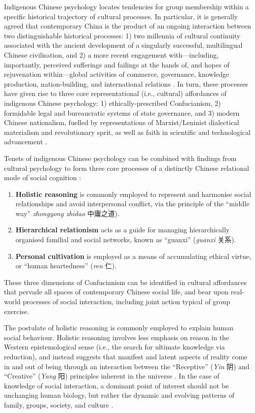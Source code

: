 \begin{CJK}{UTF8}{gbsn}
Indigenous Chinese psychology locates tendencies for group membership within a specific historical trajectory of cultural processes.  In particular, it is generally agreed that contemporary China is the product of an ongoing interaction between two distinguishable historical processes: 1) two millennia of cultural continuity associated with the ancient development of a singularly successful, multilingual Chinese civilisation, and 2) a more recent engagement with---including, importantly, perceived sufferings and failings at the hands of, and hopes of rejuvenation within---global activities of commerce, governance, knowledge production, nation-building, and international relations \citep{Liu2009}.  In turn, these processes have given rise to three core representational (i.e., cultural) affordances of indigenous Chinese psychology: 1) ethically-prescribed Confucianism, 2) formidable legal and bureaucratic systems of state governance, and 3) modern Chinese nationalism, fuelled by representations of Marxist/Leninist dialectical materialism and revolutionary sprit, as well as faith in scientific and technological advancement \citep{Barme2009}.

Tenets of indigenous Chinese psychology can be combined with findings from cultural psychology to form three core processes of a distinctly Chinese relational mode of social cognition \citep{Liu2014}:

    \begin{enumerate}
      \item \textbf{Holistic reasoning} is commonly employed to represent and harmonise social relationships and avoid interpersonal conflict, via the principle of the  ``middle way'' \textit{zhongyong zhidao} 中庸之道).
       \item \textbf{Hierarchical relationism} acts as a guide for managing hierarchically organised familial and social networks, known as ``guanxi'' (\textit{guanxi} 关系).
       \item \textbf{Personal cultivation} is employed as a means of accumulating ethical virtue, or ``human heartedness'' (\textit{ren} 仁).
     \end{enumerate}

These three dimensions of Confucianism can be identified in cultural affordances that pervade all spaces of contemporary Chinese social life, and bear upon real-world processes of social interaction, including joint action typical of group exercise.

The postulate of holistic reasoning is commonly employed to explain human social behaviour.  Holistic reasoning involves less emphasis on reason in the Western epistemological sense (i.e., the search for ultimate knowledge via reduction), and instead suggests that manifest and latent aspects of reality come in and out of being through an interaction between the ``Receptive'' (\textit{Yin} 阴) and ``Creative'' (\textit{Yang} 阳) principles inherent in the universe \citep{Leys1997}.  In the case of knowledge of social interaction, a dominant point of interest should not be unchanging human biology, but rather the dynamic and evolving patterns of family, groups, society, and culture \citep{Nisbett2003}.


\end{CJK}
